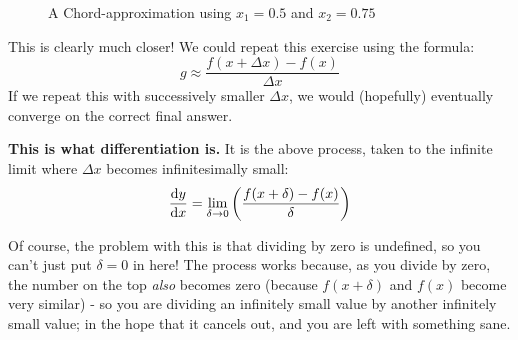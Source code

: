 \documentclass[a4paper,openany,11pt]{book}
\begin{document}
						\begin{figure}
							\begin{center}
							\end{center}
							\caption{\small A Chord-approximation using $x_1 = 0.5$ and $x_2 = 0.75$}\label{F:Chord2}
						\end{figure}
						
						This is clearly much closer! We could repeat this exercise using the formula:
						\begin{equation}
							g \approx \frac{f(x + \Delta x) - f(x)}{\Delta x}
						\end{equation}
						If we repeat this with successively smaller $\Delta x$, we would (hopefully) eventually converge on the correct final answer. 

						\textbf{This is what differentiation is.} It is the above process, taken to the infinite limit where $\Delta x$ becomes infinitesimally small:
						\begin{equation}
							\frac{\mathrm d y}{\mathrm d x} = \lim_{\delta \to 0} \left( \frac{ f(x + \delta) - f(x)}{\delta} \right)
						\end{equation}

						Of course, the problem with this is that dividing by zero is undefined, so you can't just put $\delta = 0$ in here! The process works because, as you divide by zero, the number on the top \textit{also} becomes zero (because $f(x+\delta)$ and $f(x)$ become very similar) - so you are dividing an infinitely small value by another infinitely small value; in the hope that it cancels out, and you are left with something sane. 
\end{document}
